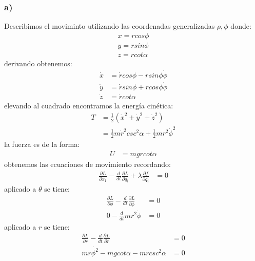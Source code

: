 \documentclass{article}
\begin{document}
\begin{tcolorbox}[breakable]
    \subsubsection*{a)}
    Describimos el moviminto utilizando las coordenadas generalizadas $\rho,\phi$ donde:
    \begin{align*}
        x = rcos\phi \\
        y = rsin\phi \\
        z = rcot\alpha
    \end{align*}
    derivando obtenemos:
    \begin{align*}
        \dot{x} &= \dot{r}cos\phi - rsin\phi \dot{\phi} \\
        \dot{y} &= \dot{r}sin\phi + rcos\phi \dot{\phi} \\
        \dot{z} &= \dot{r}cot\alpha
    \end{align*}
    elevando al cuadrado encontramos la energía cinética:
    \begin{align*}
        T 
        &= \frac{1}{2}(\dot{x}^2+\dot{y}^2+\dot{z}^2) \\
        &= \frac{1}{2}m\dot{r}^2csc^2\alpha + \frac{1}{2}mr^2\dot{\phi}^2
    \end{align*}
    la fuerza es de la forma:
    \begin{align*} 
        U 
        &= mgrcot\alpha
    \end{align*}
    obtenemos las ecuaciones de movimiento recordando:
    \begin{align*}
        \frac{\partial L}{\partial x_1} - \frac{d}{dt}\frac{\partial L }{\partial \dot{q}_i} + \lambda \frac{\partial f}{\partial q_i} &= 0 
    \end{align*}
    aplicado a $\theta$ se tiene:
    \begin{align*}
        \frac{\partial L}{\partial \phi} - \frac{d}{dt}\frac{\partial L}{\partial \dot{\phi}} &= 0 \\ 
        0 - \frac{d}{dt}mr^2\dot{\phi} &= 0
    \end{align*}
    aplicado a $r$ se tiene:
    \begin{align*}
        \frac{\partial L}{\partial r} - \frac{d}{dt}\frac{\partial L}{\partial \dot{r}} &= 0 \\ 
        mr\dot{\phi^2} - mgcot\alpha - m\ddot{r}csc^2\alpha &= 0 \\ 
    \end{align*}

\end{tcolorbox}
\end{document}
